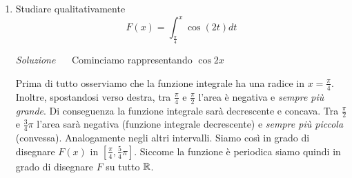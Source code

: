 \documentclass{article}
\begin{document}
\begin{enumerate}[label=\textbf{Esercizio 10.\arabic*.},itemindent=*]
\item Studiare qualitativamente 
\[F(x)=\int_{\frac{\pi}{4}}^{x}\cos(2t)dt\]
\item[\textit{\large Soluzione~}]~
Cominciamo rappresentando $\cos 2x$
\begin{figure}[ht]
    \centering
\end{figure}
Prima di tutto osserviamo che la funzione integrale ha una radice in $x=\frac{\pi}{4}$. Inoltre, spostandosi verso destra, tra $\frac{\pi}{4}$ e $\frac{\pi}{2}$ l'area è negativa e \textit{sempre più grande}. Di conseguenza la funzione integrale sarà decrescente e concava. Tra $\frac{\pi}{2}$ e $\frac{3}{4}\pi$ l'area sarà negativa (funzione integrale decrescente) e \textit{sempre più piccola} (convessa). Analogamente negli altri intervalli. Siamo così in grado di disegnare $F(x)$ in $\left[ \frac{\pi}{4}, \frac{5}{4}\pi\right]$. Siccome la funzione è periodica siamo quindi in grado di disegnare $F$ su tutto $\mathbb{R}$.
\begin{figure}[ht]
    \centering
\end{figure}

\begin{table*}[ht]
    \centering

\end{table*}
\end{enumerate}
\end{document}

